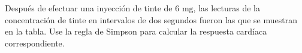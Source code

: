 \item Después de efectuar una inyección de tinte de $6 \text{ mg}$, las lecturas de la concentración de tinte en intervalos de dos segundos fueron las que se muestran en la tabla. Use la regla de Simpson para calcular la respuesta cardíaca correspondiente.
